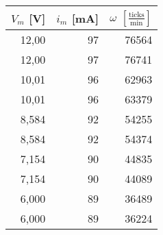 \begin{tabular}{r|r|r}
$V_m$ [V]&$i_m$ [mA]&$\omega$ $\left[\frac{\text{ticks}}{\text{min}}\right]$\\\hline
12,00&97&76564\\ %
12,00&97&76741\\ %
10,01&96&62963\\ %
10,01&96&63379\\ %
8,584&92&54255\\
8,584&92&54374\\
7,154&90&44835\\
7,154&90&44089\\
6,000&89&36489\\
6,000&89&36224\\
\end{tabular}
